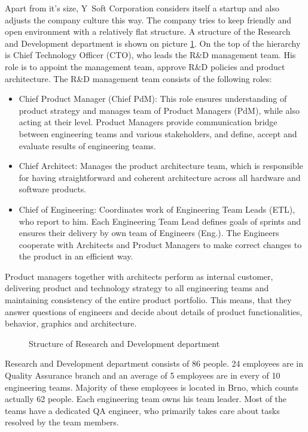 \documentclass[11pt,singleside]{myfithesis2}
\newcommand{\pict}[4]{
	\begin{figure}[h!]
  		\vspace{-7px}
  		\centerline{\fcolorbox{darkgray}{palegray}{\texttt{[image: \#2]}}}
  		\caption{#1}
  		\label{#4}
	\end{figure}
}
\begin{document}
Apart from it's size, Y~Soft Corporation considers itself a startup and also adjusts the company culture this way. The company tries to keep friendly and open environment with a relatively flat structure. A structure of the Research and Development department is shown on picture \ref{pic:rndStructure}. On the top of the hierarchy is Chief Technology Officer (CTO), who leads the R\&D management team. His role is to appoint the management team, approve R\&D policies and product architecture. The R\&D management team consists of the following roles:
\begin{itemize}
	\item{Chief Product Manager (Chief PdM):} This role ensures understanding of product strategy and manages team of Product Managers (PdM), while also acting at their level. Product Managers provide communication bridge between engineering teams and various stakeholders, and define, accept and evaluate results of engineering teams.
	\item{Chief Architect:} Manages the product architecture team, which is responsible for having straightforward and coherent architecture across all hardware and software products.  
	\item{Chief of Engineering:} Coordinates work of Engineering Team Leads (ETL), who report to him. Each Engineering Team Lead defines goals of sprints and ensures their delivery by own team of Engineers (Eng.). The Engineers cooperate with Architects and Product Managers to make correct changes to the product in an efficient way.
\end{itemize}
Product managers together with architects perform as internal customer, delivering product and technology strategy to all engineering teams and maintaining consistency of the entire product portfolio. This means, that they answer questions of engineers and decide about details of product functionalities, behavior, graphics and architecture. 

\pict{Structure of Research and Development department}{data/rndStructure.png}{width=1\textwidth}{pic:rndStructure}

Research and Development department consists of 86 people. 24 employees are in Quality Assurance branch and an average of 5 employees are in every of 10 engineering teams. Majority of these employees is located in Brno, which counts actually 62 people. Each engineering team owns his team leader. Most of the teams have a dedicated QA engineer, who primarily takes care about tasks resolved by the team members.
\end{document}
